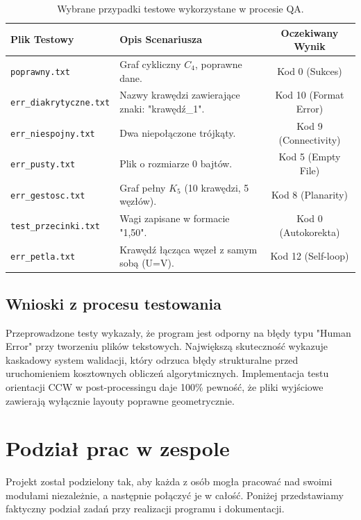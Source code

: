 \documentclass[12pt,a4paper]{article}
\begin{document}
\begin{table}[h]
    \centering
    \small
    \begin{tabularx}{\textwidth}{@{} l X c @{}}
        \toprule
        \textbf{Plik Testowy} & \textbf{Opis Scenariusza} & \textbf{Oczekiwany Wynik} \\
        \midrule
        \texttt{poprawny.txt} & Graf cykliczny $C_4$, poprawne dane. & Kod 0 (Sukces) \\
        \texttt{err\_diakrytyczne.txt} & Nazwy krawędzi zawierające znaki: "krawędź\_1". & Kod 10 (Format Error) \\
        \texttt{err\_niespojny.txt} & Dwa niepołączone trójkąty. & Kod 9 (Connectivity) \\
        \texttt{err\_pusty.txt} & Plik o rozmiarze 0 bajtów. & Kod 5 (Empty File) \\
        \texttt{err\_gestosc.txt} & Graf pełny $K_5$ (10 krawędzi, 5 węzłów). & Kod 8 (Planarity) \\
        \texttt{test\_przecinki.txt} & Wagi zapisane w formacie "1,50". & Kod 0 (Autokorekta) \\
        \texttt{err\_petla.txt} & Krawędź łącząca węzeł z samym sobą (U=V). & Kod 12 (Self-loop) \\
        \bottomrule
    \end{tabularx}
    \caption{Wybrane przypadki testowe wykorzystane w procesie QA.}
\end{table}

\subsection{Wnioski z procesu testowania}
Przeprowadzone testy wykazały, że program jest odporny na błędy typu "Human Error" przy tworzeniu plików tekstowych. Największą skuteczność wykazuje kaskadowy system walidacji, który odrzuca błędy strukturalne przed uruchomieniem kosztownych obliczeń algorytmicznych. Implementacja testu orientacji CCW w post-processingu daje 100\% pewność, że pliki wyjściowe zawierają wyłącznie layouty poprawne geometrycznie.
\newpage
\section{Podział prac w zespole}

Projekt został podzielony tak, aby każda z osób mogła pracować nad swoimi modułami niezależnie, a następnie połączyć je w całość. Poniżej przedstawiamy faktyczny podział zadań przy realizacji programu i dokumentacji.
\end{document}
